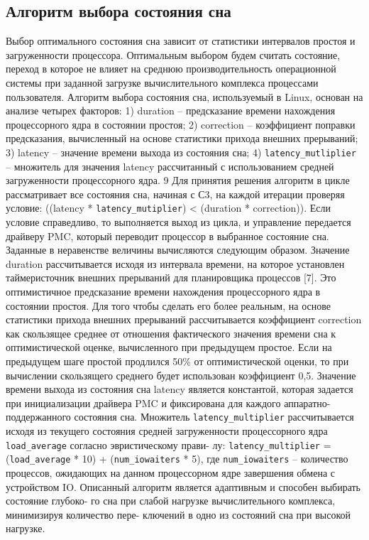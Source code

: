 \documentclass{article}
\begin{document}
\subsection{Алгоритм выбора состояния сна}
Выбор оптимального состояния сна зависит от статистики интервалов простоя и загруженности процессора. Оптимальным выбором будем считать состояние, переход в которое не влияет на среднюю производительность операционной системы при заданной загрузке вычислительного комплекса процессами пользователя.
Алгоритм выбора состояния сна, используемый в Linux, основан на анализе четырех
факторов:
1) duration – предсказание времени нахождения процессорного ядра в состоянии
простоя;
2) correction – коэффициент поправки предсказания, вычисленный на основе статистики прихода внешних прерываний;
3) latency – значение времени выхода из состояния сна;
4) \texttt{latency\_mutliplier} – множитель для значения latency рассчитанный с использованием средней загруженности процессорного ядра.
9
Для принятия решения алгоритм в цикле рассматривает все состояния сна, начиная с
С3, на каждой итерации проверяя условие:
((latency * \texttt{latency\_mutiplier}) < (duration * correction)).
Если условие справедливо, то выполняется выход из цикла, и управление передается
драйверу PMC, который переводит процессор в выбранное состояние сна.
Заданные в неравенстве величины вычисляются следующим образом. Значение
duration рассчитывается исходя из интервала времени, на которое установлен таймеристочник внешних прерываний для планировщика процессов [7]. Это оптимистичное
предсказание времени нахождения процессорного ядра в состоянии простоя. Для того
чтобы сделать его более реальным, на основе статистики прихода внешних прерываний
рассчитывается коэффициент correction как скользящее среднее от отношения фактического значения времени сна к оптимистической оценке, вычисленного при предыдущем
простое. Если на предыдущем шаге простой продлился 50\% от оптимистической оценки,
то при вычислении скользящего среднего будет использован коэффициент 0,5. Значение
времени выхода из состояния сна latency является константой, которая задается при инициализации драйвера PMC и фиксирована для каждого аппаратно-поддержанного состояния сна. Множитель \texttt{latency\_multiplier} рассчитывается исходя из текущего состояния
средней загруженности процессорного ядра \texttt{load\_average} согласно эвристическому прави-
лу:
\texttt{latency\_multiplier} = (\texttt{load\_average} * 10) + (\texttt{num\_iowaiters} * 5),
где \texttt{num\_iowaiters} – количество процессов, ожидающих на данном процессорном ядре завершения обмена с устройством IO.
Описанный алгоритм является адаптивным и способен выбирать состояние глубоко-
го сна при слабой нагрузке вычислительного комплекса, минимизируя количество пере-
ключений в одно из состояний сна при высокой нагрузке.
\end{document}
